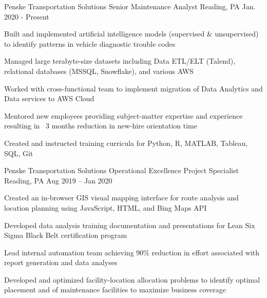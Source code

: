 


\begin{cventries}


\cventry
{Penske Transportation Solutions} %
{Senior Maintenance Analyst} %
{Reading, PA} %
{Jan. 2020 - Present} %
{ %
\begin{cvitems}
\item {Built and implemented artificial intelligence models (supervised \& unsupervised) to identify patterns in vehicle diagnostic trouble codes }
\item {Managed large terabyte-size datasets including Data ETL/ELT (Talend), relational databases (MSSQL, Snowflake), and various AWS}
\item {Worked with cross-functional team to implement migration of Data Analytics and Data services to AWS Cloud}
\item {Mentored new employees providing subject-matter expertise and experience resulting in ~3 months reduction in new-hire orientation time}
\item {Created and instructed training curricula for Python, R, MATLAB, Tableau, SQL, Git}
\end{cvitems}
}


\cventry
{Penske Transportation Solutions} %
{Operational Excellence Project Specialist} %
{Reading, PA} %
{Aug 2019 – Jan 2020} %
{ %
\begin{cvitems}
\item {Created an in-browser GIS visual mapping interface for route analysis and location planning using JavaScript, HTML, and Bing Maps API}
\item {Developed data analysis training documentation and presentations for Lean Six Sigma Black Belt certification program}
\item {Lead internal automation team achieving 90\% reduction in effort associated with report generation and data analyses}
\item {Developed and optimized facility-location allocation problems to identify optimal placement and of maintenance facilities to maximize business coverage}
\end{cvitems}
}


\end{cventries}
